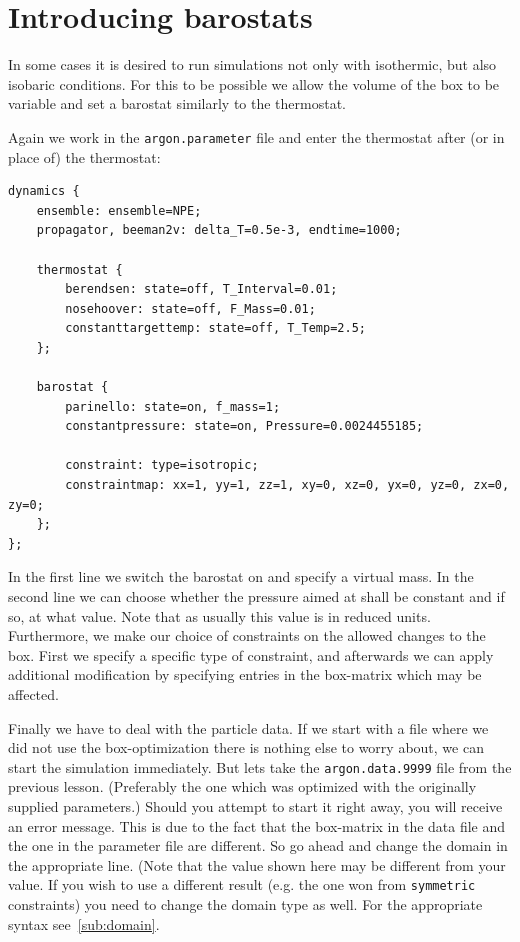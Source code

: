 \section{Introducing barostats}
\label{tutorial:barostat}
In some cases it is desired to run simulations not only with isothermic, but also isobaric conditions.
For this to be possible we allow the volume of the box to be variable and set a barostat similarly to the thermostat.

Again we work in the \texttt{argon.parameter} file and enter the thermostat after (or in place of) the thermostat:
\begin{lstlisting}
dynamics {
    ensemble: ensemble=NPE;
    propagator, beeman2v: delta_T=0.5e-3, endtime=1000;

    thermostat {
        berendsen: state=off, T_Interval=0.01;
        nosehoover: state=off, F_Mass=0.01;
        constanttargettemp: state=off, T_Temp=2.5;
    };

    barostat {
        parinello: state=on, f_mass=1;
        constantpressure: state=on, Pressure=0.0024455185;

        constraint: type=isotropic;
        constraintmap: xx=1, yy=1, zz=1, xy=0, xz=0, yx=0, yz=0, zx=0, zy=0;
    };
};
\end{lstlisting}
In the first line we switch the barostat on and specify a virtual mass.
In the second line we can choose whether the pressure aimed at shall be constant and if so, at what value. Note that as usually this value is in reduced units.
Furthermore, we make our choice of constraints on the allowed changes to the box. First we specify a specific type of constraint, and afterwards we can apply
additional modification by specifying entries in the box-matrix which may be affected.

Finally we have to deal with the particle data. If we start with a file where we did not use the box-optimization there is nothing else to worry about, we can start
the simulation immediately. But lets take the \texttt{argon.data.9999} file from the previous lesson. (Preferably the one which was optimized with the originally supplied parameters.) Should you attempt to start it right away, you will receive an error
message. This is due to the fact that the box-matrix in the data file and the one in the parameter file are different. So go ahead and change the domain in the
appropriate line. (Note that the value shown here may be different from your value. If you wish to use a different result (e.g. the one won from \texttt{symmetric}
constraints) you need to change the domain type as well. For the appropriate syntax see~\ref{sub:domain}.

